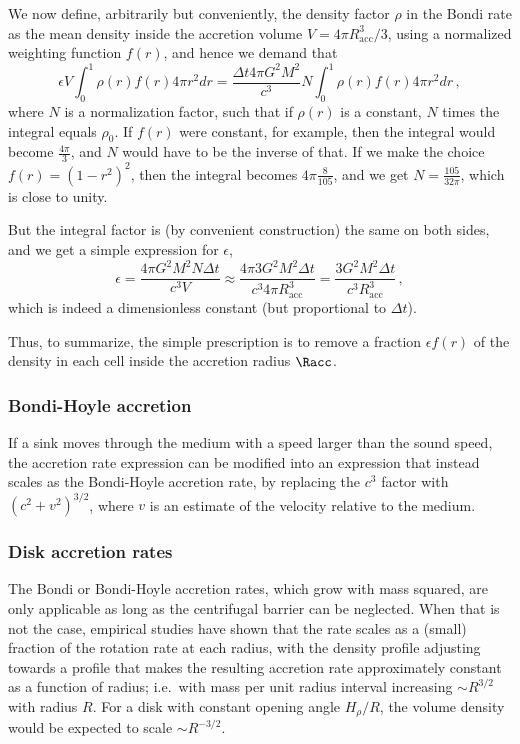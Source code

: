 \documentclass[paper=a4,fontsize=11pt]{scrartcl}
\numberwithin{equation}{section}		%
\numberwithin{figure}{section}			%
\numberwithin{table}{section}				%
\begin{document}
We now define, arbitrarily but conveniently, the density factor $\rho$ in the Bondi rate as the mean density inside the accretion volume $V=4\pi R_\mathrm{acc}^3/3$, using a normalized weighting function $f(r)$, and hence we demand that
\begin{equation}
    \epsilon V \int_0^1 \rho(r) f(r) 4\pi r^2 dr = \frac{\Delta t 4 \pi G^2 M^2}{c^3} N \int_0^1 \rho(r) f(r) 4\pi r^2 dr \,,
\end{equation}
where $N$ is a normalization factor, such that if $\rho(r)$ is a constant, $N$ times the integral equals $\rho_0$.  If $f(r)$ were constant, for example, then the integral would become $\frac{4\pi}{3}$, and $N$ would have to be the inverse of that.  If we make the choice $f(r)=(1-r^2)^2$, then the integral becomes $4\pi\frac{8}{105}$, and we get $N=\frac{105}{32 \pi}$, which is close to unity.

But the integral factor is (by convenient construction) the same on both sides, and we get a simple expression for $\epsilon$, 
\begin{equation}
    \epsilon = \frac{4 \pi G^2 M^2 N \Delta t}{c^3 V} 
    \approx \frac{4 \pi 3 G^2 M^2 \Delta t }{c^3 4\pi R_\mathrm{acc}^3}
    = \frac{3 G^2 M^2 \Delta t}{c^3 R_\mathrm{acc}^3} \,,
\end{equation}
which is indeed a dimensionless constant (but proportional to $\Delta t$).

Thus, to summarize, the simple prescription is to remove a fraction $\epsilon f(r)$ of the density in each cell inside the accretion radius $\Racc$.

\subsubsection{Bondi-Hoyle accretion}

If a sink moves through the medium with a speed larger than the sound speed, the accretion rate expression can be modified into an expression that instead scales as the Bondi-Hoyle accretion rate, by replacing the $c^3$ factor with $(c^2 + v^2)^{3/2}$, where $v$ is an estimate of the velocity relative to the medium.

\subsubsection{Disk accretion rates}
The Bondi or Bondi-Hoyle accretion rates, which grow with mass squared, are only applicable as long as the centrifugal barrier can be neglected.  When that is not the case, empirical studies have shown that the rate scales as a (small) fraction of the rotation rate at each radius, with the density profile adjusting towards a profile that makes the resulting accretion rate approximately constant as a function of radius; i.e.\ with mass per unit radius interval increasing $\sim R^{3/2}$ with radius $R$.  For a disk with constant opening angle $H_\rho/R$, the volume density would be expected to scale $\sim R^{-3/2}$.
\end{document}
